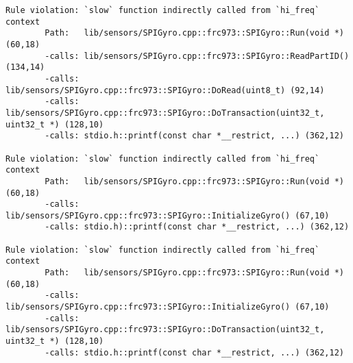 \noindent\begin{minipage}[t]{\linewidth}
\begin{lstlisting}[caption={Output of running funqual on robotics library.  This is not the entire output, but rather a small snippet of it},label={lst:app:blocking:output}]
Rule violation: `slow` function indirectly called from `hi_freq` context
        Path:   lib/sensors/SPIGyro.cpp::frc973::SPIGyro::Run(void *) (60,18)
        -calls: lib/sensors/SPIGyro.cpp::frc973::SPIGyro::ReadPartID() (134,14)
        -calls: lib/sensors/SPIGyro.cpp::frc973::SPIGyro::DoRead(uint8_t) (92,14)
        -calls: lib/sensors/SPIGyro.cpp::frc973::SPIGyro::DoTransaction(uint32_t, uint32_t *) (128,10)
        -calls: stdio.h::printf(const char *__restrict, ...) (362,12)

Rule violation: `slow` function indirectly called from `hi_freq` context
        Path:   lib/sensors/SPIGyro.cpp::frc973::SPIGyro::Run(void *) (60,18)
        -calls: lib/sensors/SPIGyro.cpp::frc973::SPIGyro::InitializeGyro() (67,10)
        -calls: stdio.h)::printf(const char *__restrict, ...) (362,12)

Rule violation: `slow` function indirectly called from `hi_freq` context
        Path:   lib/sensors/SPIGyro.cpp::frc973::SPIGyro::Run(void *) (60,18)
        -calls: lib/sensors/SPIGyro.cpp::frc973::SPIGyro::InitializeGyro() (67,10)
        -calls: lib/sensors/SPIGyro.cpp::frc973::SPIGyro::DoTransaction(uint32_t, uint32_t *) (128,10)
        -calls: stdio.h::printf(const char *__restrict, ...) (362,12)
\end{lstlisting}
\end{minipage}
